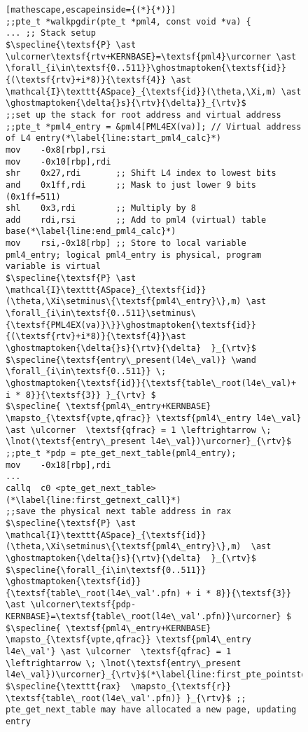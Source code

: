\begin{figure}
\else
\begin{lstlisting}[mathescape,escapeinside={(*}{*)}]
;;pte_t *walkpgdir(pte_t *pml4, const void *va) {
... ;; Stack setup
$\specline{\textsf{P} \ast \ulcorner\textsf{rtv+KERNBASE}=\textsf{pml4}\urcorner \ast \forall_{i\in\textsf{0..511}}\ghostmaptoken{\textsf{id}}{(\textsf{rtv}+i*8)}{\textsf{4}} \ast \mathcal{I}\texttt{ASpace}_{\textsf{id}}(\theta,\Xi,m) \ast \ghostmaptoken{\delta{}s}{\rtv}{\delta}}_{\rtv}$
;;set up the stack for root address and virtual address    
;;pte_t *pml4_entry = &pml4[PML4EX(va)]; // Virtual address of L4 entry(*\label{line:start_pml4_calc}*)
mov    -0x8[rbp],rsi
mov    -0x10[rbp],rdi
shr    0x27,rdi       ;; Shift L4 index to lowest bits
and    0x1ff,rdi      ;; Mask to just lower 9 bits (0x1ff=511)
shl    0x3,rdi        ;; Multiply by 8
add    rdi,rsi        ;; Add to pml4 (virtual) table base(*\label{line:end_pml4_calc}*)
mov    rsi,-0x18[rbp] ;; Store to local variable pml4_entry; logical pml4_entry is physical, program variable is virtual
$\specline{\textsf{P} \ast \mathcal{I}\texttt{ASpace}_{\textsf{id}}(\theta,\Xi\setminus\{\textsf{pml4\_entry}\},m) \ast \forall_{i\in\textsf{0..511}\setminus\{\textsf{PML4EX(va)}\}}\ghostmaptoken{\textsf{id}}{(\textsf{rtv}+i*8)}{\textsf{4}}\ast \ghostmaptoken{\delta{}s}{\rtv}{\delta}  }_{\rtv}$
$\specline{\textsf{entry\_present(l4e\_val)} \wand \forall_{i\in\textsf{0..511}} \; \ghostmaptoken{\textsf{id}}{\textsf{table\_root(l4e\_val)+ i * 8}}{\textsf{3}} }_{\rtv} $
$\specline{ \textsf{pml4\_entry+KERNBASE} \mapsto_{\textsf{vpte,qfrac}} \textsf{pml4\_entry l4e\_val} \ast \ulcorner  \textsf{qfrac} = 1 \leftrightarrow \; \lnot(\textsf{entry\_present l4e\_val})\urcorner}_{\rtv}$    
;;pte_t *pdp = pte_get_next_table(pml4_entry);
mov    -0x18[rbp],rdi
...
callq  c0 <pte_get_next_table>(*\label{line:first_getnext_call}*)
;;save the physical next table address in rax
$\specline{\textsf{P} \ast \mathcal{I}\texttt{ASpace}_{\textsf{id}}(\theta,\Xi\setminus\{\textsf{pml4\_entry}\},m)  \ast \ghostmaptoken{\delta{}s}{\rtv}{\delta}  }_{\rtv}$
$\specline{\forall_{i\in\textsf{0..511}} \ghostmaptoken{\textsf{id}}{\textsf{table\_root(l4e\_val'.pfn) + i * 8}}{\textsf{3}}  \ast \ulcorner\textsf{pdp-KERNBASE}=\textsf{table\_root(l4e\_val'.pfn)}\urcorner} $
$\specline{ \textsf{pml4\_entry+KERNBASE} \mapsto_{\textsf{vpte,qfrac}} \textsf{pml4\_entry l4e\_val'} \ast \ulcorner  \textsf{qfrac} = 1 \leftrightarrow \; \lnot(\textsf{entry\_present l4e\_val})\urcorner}_{\rtv}$(*\label{line:first_pte_pointsto}*)
$\specline{\texttt{rax}  \mapsto_{\textsf{r}} \textsf{table\_root(l4e\_val'.pfn)} }_{\rtv}$ ;; pte_get_next_table may have allocated a new page, updating entry

\end{lstlisting}
\end{figure}
